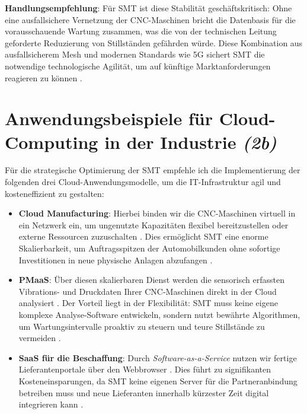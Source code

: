 \textbf{Handlungsempfehlung}: Für \acs{SMT} ist diese Stabilität geschäftskritisch: Ohne eine ausfallsichere Vernetzung der \acs{CNC}-Maschinen bricht die Datenbasis für die vorausschauende Wartung zusammen, was die von der technischen Leitung geforderte Reduzierung von Stillständen gefährden würde. Diese Kombination aus ausfallsicherem Mesh und modernen Standards wie \acs{5G} sichert \acs{SMT} die notwendige technologische Agilität, um auf künftige Marktanforderungen reagieren zu können \cite[75]{2}.


\section{Anwendungsbeispiele für Cloud-Computing in der Industrie \textit{(2b)}}
\label{sec:2b}

Für die strategische Optimierung der \acs{SMT} empfehle ich die Implementierung der folgenden drei Cloud-Anwendungsmodelle, um die \acs{IT}-Infrastruktur agil und kosteneffizient zu gestalten:

\begin{itemize}[leftmargin=*]
    \item \textbf{Cloud Manufacturing}: Hierbei binden wir die \acs{CNC}-Maschinen virtuell in ein Netzwerk ein, um ungenutzte Kapazitäten flexibel bereitzustellen oder externe Ressourcen zuzuschalten \cite[10]{2}. Dies ermöglicht \acs{SMT} eine enorme Skalierbarkeit, um Auftragsspitzen der Automobilkunden ohne sofortige Investitionen in neue physische Anlagen abzufangen \cite[76]{1}.
    
    \item \textbf{\acs{PMaaS}}: Über diesen skalierbaren Dienst werden die sensorisch erfassten Vibrations- und Druckdaten Ihrer \acs{CNC}-Maschinen direkt in der Cloud analysiert \cite[31]{2}. Der Vorteil liegt in der Flexibilität: \acs{SMT} muss keine eigene komplexe Analyse-Software entwickeln, sondern nutzt bewährte Algorithmen, um Wartungsintervalle proaktiv zu steuern und teure Stillstände zu vermeiden \cite[39]{2}.
    
    \item \textbf{SaaS für die Beschaffung}: Durch \textit{Software-as-a-Service} nutzen wir fertige Lieferantenportale über den Webbrowser \cite[75]{1}. Dies führt zu signifikanten Kosteneinsparungen, da \acs{SMT} keine eigenen Server für die Partneranbindung betreiben muss und neue Lieferanten innerhalb kürzester Zeit digital integrieren kann \cite[76]{1}.
\end{itemize}


